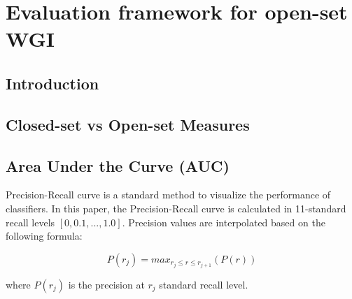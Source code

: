 
\chapter{Evaluation framework for open-set WGI}

\label{chap:eval_methods}


\newcommand{\keyword}[1]{\textbf{#1}}
\newcommand{\tabhead}[1]{\textbf{#1}}
\newcommand{\code}[1]{\texttt{#1}}
\newcommand{\file}[1]{\texttt{\bfseries#1}}
\newcommand{\option}[1]{\texttt{\itshape#1}}


\section{Introduction}\label{chap:eval_mentods:sec:intro}

\section{Closed-set vs Open-set Measures}\label{chap:eval_mentods:sec:Measures} 

\section{Area Under the Curve (AUC)}\label{chap:eval_mentods:sec:closed_set_classification} 

Precision-Recall curve is a standard method to visualize the performance of classifiers. In this paper, the Precision-Recall curve is calculated in 11-standard recall levels $[0,0.1,...,1.0]$. Precision values are interpolated based on the following formula:

\begin{equation}
	P(r_j)=max_{r_j \leqslant r \leqslant r_{j+1}}(P(r))
\end{equation}

\noindent
where $P(r_j)$ is the precision at $r_j$ standard recall level.

